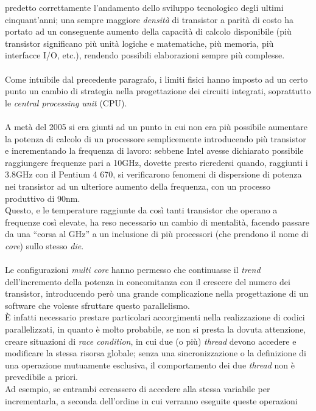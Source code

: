 predetto correttamente l'andamento dello sviluppo tecnologico degli ultimi
cinquant'anni; una sempre maggiore \emph{densità} di transistor a parità
di costo ha portato ad un conseguente aumento della capacità di calcolo 
disponibile (più transistor significano più unità logiche e matematiche,
più memoria, più interfacce I/O, etc.), rendendo possibili elaborazioni
sempre più complesse. 
\\ \\
Come intuibile dal precedente paragrafo, i limiti fisici hanno imposto ad un 
certo punto un cambio di strategia nella progettazione dei circuiti integrati,
soprattutto le \emph{central processing unit} (CPU).
\\ \\
A metà del 2005 si era giunti ad un punto in cui non era più possibile 
aumentare la potenza di calcolo di un processore semplicemente introducendo
più transistor e incrementando la frequenza di lavoro: sebbene Intel avesse 
dichiarato possibile raggiungere frequenze pari a 10GHz, dovette presto 
ricredersi quando, raggiunti i 3.8GHz con il Pentium 4 670, si verificarono 
fenomeni di dispersione di potenza nei transistor ad un ulteriore aumento della 
frequenza, con un processo produttivo di 90nm. \\
Questo, e le temperature raggiunte da così tanti transistor che operano a 
frequenze così elevate, ha reso necessario un cambio di mentalità, facendo 
passare da una ``corsa al GHz'' a un inclusione di più processori (che 
prendono il nome di \emph{core}) sullo stesso \emph{die}. 
\\ \\
Le configurazioni \emph{multi core} hanno permesso che continuasse il 
\emph{trend} dell'incremento della potenza in concomitanza con il crescere 
del numero dei transistor, introducendo però una grande complicazione nella 
progettazione di un software che volesse sfruttare questo parallelismo. \\
È infatti necessario prestare particolari accorgimenti nella realizzazione 
di codici parallelizzati, in quanto è molto probabile, se non si presta la 
dovuta attenzione, creare situazioni di \emph{race condition}, in cui due (o 
più) \emph{thread} devono accedere e modificare la stessa risorsa globale; 
senza una sincronizzazione o la definizione di una operazione mutuamente 
esclusiva, il comportamento dei due \emph{thread} non è prevedibile a priori. \\
Ad esempio, se entrambi cercassero di accedere alla stessa variabile per 
incrementarla, a seconda dell'ordine in cui verranno eseguite queste operazioni 
